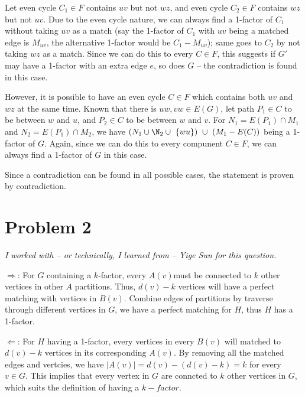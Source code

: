 \documentclass[11pt]{article}
\begin{document}
Let even cycle $C_1 \in F$ contains $uv$ but not $wz$, and even cycle $C_2 \in F$ contains $wz$ but not $uv$. Due to the even cycle nature, we can always find a 1-factor of $C_1$ without taking $uv$ as a match (say the 1-factor of $C_1$ with $uv$ being a matched edge is $M_{uv}$, the alternative 1-factor would be $C_1 - M_{uv}$); same goes to $C_2$ by not taking $wz$ as a match. Since we can do this to every $C \in F$, this suggests if $G'$ may have a 1-factor with an extra edge $e$, so does $G$ -- the contradiction is found in this case.

However, it is possible to have an even cycle $C \in F$ which contains both $uv$ and $wz$ at the same time. Known that there is $uw, vw \in E(G)$, let path $P_1 \in C$ to be between $w$ and $u$, and $P_2 \in C$ to be between $w$ and $v$. For $N_1 = E(P_1) \cap M_1$ and $N_2 = E(P_1) \cap M_2$, we have $(N_1 \cup \N_2 \cup \ \{wu\})  \ \cup \ (M_1 - E(C))$ being a 1-factor of $G$. Again, since we can do this to every compunent $C \in F$, we can always find a 1-factor of $G$ in this case.\newline

Since a contradiction can be found in all possible cases, the statement is proven by contradiction.








\section{Problem 2}

\textit{I worked with -- or technically, I learned from -- Yige Sun for this question.}\newline

$\Longrightarrow$: For $G$ containing a $k$-factor, every $A(v) $must be connected to $k$ other vertices in other $A$ partitions. Thus, $d(v) - k$ vertices will have a perfect matching with vertices in $B(v)$. Combine edges of partitions by traverse through different vertices in $G$, we have a perfect matching for $H$, thus $H$ has a 1-factor.\newline

$\Longleftarrow$: For $H$ having a 1-factor, every vertices in every $B(v)$ will matched to $d(v)-k$ vertices in its corresponding $A(v)$. By removing all the matched edges and vertcies, we have $|A(v)| = d(v) - (d(v) - k) = k$ for every $v \in G$. This implies that every vertex in $G$ are conncted to $k$ other vertices in $G$, which suits the definition of having a $k-factor$.


%
% 
% 
\end{document}
